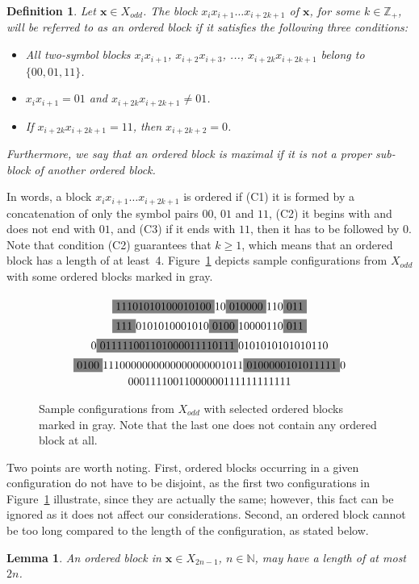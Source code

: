 \documentclass{sn-jnl}
\newtheorem{defn}{Definition}%
\newtheorem{lem}{Lemma}%
\newcommand{\xodd}{X_{odd}}
\newcommand{\bx}{\mathbf{x}}
\begin{document}
\begin{defn}\label{def:OB}
    Let $\bx\in\xodd$. The block $x_{i}x_{i+1}\ldots x_{i+2k+1}$ of $\bx$, for some $k \in \mathbb{Z}_+$, will be referred to as \emph{an ordered block} if it satisfies the following three conditions:
\begin{itemize}
\itemindent=5pt
    \item[{\rm (C1)}] All two-symbol blocks $x_{i}x_{i+1}$, $x_{i+2}x_{i+3}$, ..., $x_{i+2k}x_{i+2k+1}$ belong to $\{00, 01,11\}$.
    \item[{\rm (C2)}] $x_{i}x_{i+1}=01$ and $x_{i+2k}x_{i+2k+1}\neq 01$.
    \item[{\rm (C3)}] If $x_{i+2k}x_{i+2k+1}=11$, then $x_{i+2k+2}=0$.
\end{itemize}
Furthermore, we say that an ordered block is \emph{maximal} if it is not a proper sub-block of another ordered block.
\end{defn}
In words, a block $x_{i}x_{i+1}\ldots x_{i+2k+1}$ is ordered if {\rm (C1)} it is formed by a concatenation of only the symbol pairs $00$, $01$ and $11$, {\rm (C2)} it begins with and does not end with $01$, and {\rm (C3)} if it ends with $11$, then it has to be followed by $0$. Note that condition {\rm (C2)} guarantees that $k\geq 1$, which means that an ordered block has a length of at least~4. 
Figure~\ref{fig:ordered} depicts sample configurations from $\xodd$ with some ordered blocks marked in gray.

\begin{figure}[h]
   \[
    \xymatrix@C=0.2cm@R=-0.03cm{ 
\colorbox{gray}{11101010100010100}10\colorbox{gray}{010000}110\colorbox{gray}{011}\\
\colorbox{gray}{111}0101010001010\colorbox{gray}{0100}10000110\colorbox{gray}{011}\\
0\colorbox{gray}{011111001101000011110111}0101010101010110  \\
\colorbox{gray}{0100}1110000000000000000001011\colorbox{gray}{0100000101011111}0\\
00011110011000000111111111111
}\]
    \caption{Sample configurations from $\xodd$ with selected ordered blocks marked in gray. Note that the last one does not contain any ordered block at all.}
    \label{fig:ordered}
\end{figure}


Two points are worth noting. First, ordered blocks occurring in a given configuration do not have to be disjoint, as the first two configurations in Figure~\ref{fig:ordered} illustrate, since they are actually the same; however, this fact can be ignored as it does not affect our considerations. Second, an ordered block cannot be too long compared to the length of the configuration, as stated below.
\begin{lem}\label{lem:OB}
An ordered block in $\bx\in X_{2n-1}$, $n \in \mathbb{N}$, may have a length of at most $2n$.
\end{lem}
\end{document}
